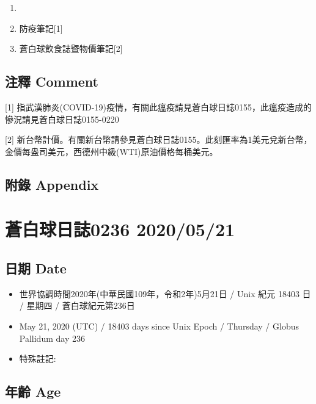 \documentclass[
]{article}
\providecommand{\tightlist}{%
  \setlength{\itemsep}{0pt}\setlength{\parskip}{0pt}}
\begin{document}
\begin{enumerate}
\def\labelenumi{\arabic{enumi}.}
\item
\item
  防疫筆記{[}1{]}
\item
  蒼白球飲食誌暨物價筆記{[}2{]}
\end{enumerate}

\hypertarget{ux6ce8ux91cb-comment-19}{%
\subsection{注釋 Comment}\label{ux6ce8ux91cb-comment-19}}

{[}1{]}
指武漢肺炎(COVID-19)疫情，有關此瘟疫請見蒼白球日誌0155，此瘟疫造成的慘況請見蒼白球日誌0155-0220

{[}2{]}
新台幣計價。有關新台幣請參見蒼白球日誌0155。此刻匯率為1美元兌新台幣，金價每盎司美元，西德州中級(WTI)原油價格每桶美元。

\hypertarget{ux9644ux9304-appendix-19}{%
\subsection{附錄 Appendix}\label{ux9644ux9304-appendix-19}}

\hypertarget{ux84bcux767dux7403ux65e5ux8a8c0236-20200521}{%
\section{蒼白球日誌0236
2020/05/21}\label{ux84bcux767dux7403ux65e5ux8a8c0236-20200521}}

\hypertarget{ux65e5ux671f-date-20}{%
\subsection{日期 Date}\label{ux65e5ux671f-date-20}}

\begin{itemize}
\tightlist
\item
  世界協調時間2020年(中華民國109年，令和2年)5月21日 / Unix 紀元 18403 日
  / 星期四 / 蒼白球紀元第236日
\item
  May 21, 2020 (UTC) / 18403 days since Unix Epoch / Thursday / Globus
  Pallidum day 236
\item
  特殊註記:
\end{itemize}

\hypertarget{ux5e74ux9f61-age-20}{%
\subsection{年齡 Age}\label{ux5e74ux9f61-age-20}}
\end{document}
